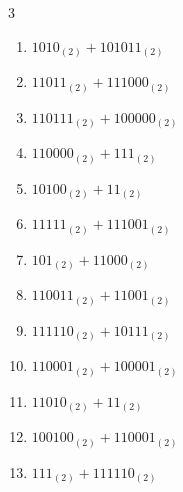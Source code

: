 \begin{multicols}{3}
\begin{enumerate}
  \item $1010_{(2)} + 101011_{(2)}$


\columnbreak %

  \item $11011_{(2)} + 111000_{(2)}$


  \item $110111_{(2)} + 100000_{(2)}$


  \item $110000_{(2)} + 111_{(2)}$


  \item $10100_{(2)} + 11_{(2)}$


  \item $11111_{(2)} + 111001_{(2)}$


  \item $101_{(2)} + 11000_{(2)}$


  \item $110011_{(2)} + 11001_{(2)}$


  \item $111110_{(2)} + 10111_{(2)}$


  \item $110001_{(2)} + 100001_{(2)}$


  \item $11010_{(2)} + 11_{(2)}$


\columnbreak %

\resetques

  \item $100100_{(2)} + 110001_{(2)}$


  \item $111_{(2)} + 111110_{(2)}$



\end{enumerate}
\end{multicols}
